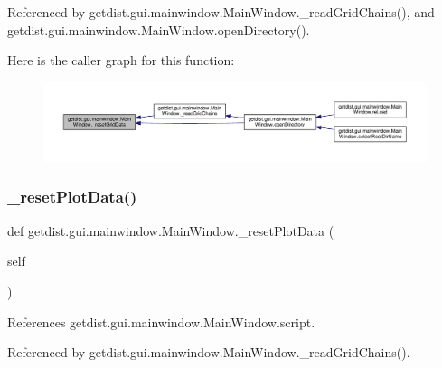Referenced by getdist.\+gui.\+mainwindow.\+Main\+Window.\+\_\+read\+Grid\+Chains(), and getdist.\+gui.\+mainwindow.\+Main\+Window.\+open\+Directory().

Here is the caller graph for this function\+:
\nopagebreak
\begin{figure}[H]
\begin{center}
\leavevmode
\includegraphics[width=350pt]{classgetdist_1_1gui_1_1mainwindow_1_1MainWindow_aa66e5484958005c6d6dfd988a05ac83a_icgraph}
\end{center}
\end{figure}
\mbox{\label{classgetdist_1_1gui_1_1mainwindow_1_1MainWindow_a3e7c9caefe4a820ec6d2f2d1cf7a41c8}} 
\subsubsection{\texorpdfstring{\+\_\+reset\+Plot\+Data()}{\_resetPlotData()}}
{\footnotesize\ttfamily def getdist.\+gui.\+mainwindow.\+Main\+Window.\+\_\+reset\+Plot\+Data (\begin{DoxyParamCaption}\item[{}]{self }\end{DoxyParamCaption})\hspace{0.3cm}{\ttfamily [private]}}



References getdist.\+gui.\+mainwindow.\+Main\+Window.\+script.



Referenced by getdist.\+gui.\+mainwindow.\+Main\+Window.\+\_\+read\+Grid\+Chains().

